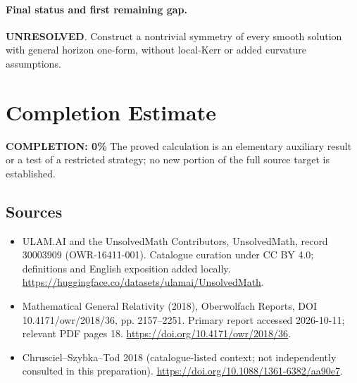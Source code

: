\documentclass[11pt]{article}
\begin{document}
\paragraph{Final status and first remaining gap.}
\textbf{UNRESOLVED}. Construct a nontrivial symmetry of every smooth solution with general horizon one-form, without local-Kerr or added curvature assumptions.

\section{Completion Estimate}
\noindent\textbf{COMPLETION: 0\%}
The proved calculation is an elementary auxiliary result or a test of a restricted strategy; no new portion of the full source target is established.

\subsection{Sources}
\begin{itemize}
\item[\hypertarget{source:30003909:1}{S1}] ULAM.AI and the UnsolvedMath Contributors, UnsolvedMath, record 30003909 (OWR-16411-001). Catalogue curation under CC BY 4.0; definitions and English exposition added locally.
\url{https://huggingface.co/datasets/ulamai/UnsolvedMath}.
\item[\hypertarget{source:30003909:2}{S2}] Mathematical General Relativity (2018), Oberwolfach Reports, DOI 10.4171/owr/2018/36, pp. 2157--2251. Primary report accessed 2026-10-11; relevant PDF pages 18.
\url{https://doi.org/10.4171/owr/2018/36}.
\item[\hypertarget{source:30003909:3}{S3}] Chrusciel--Szybka--Tod 2018 (catalogue-listed context; not independently consulted in this preparation).
\url{https://doi.org/10.1088/1361-6382/aa90e7}.
\end{itemize}
\label{end:30003909}
\end{document}
